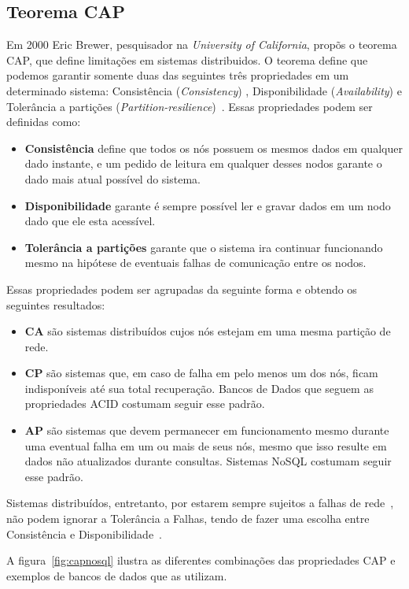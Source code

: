 \subsection{Teorema CAP}
\label{sec:cap}
	Em 2000 Eric Brewer, pesquisador na \emph{University of California}, propõs o teorema CAP, que define limitações em sistemas distribuidos. O teorema define que podemos garantir somente duas das seguintes três propriedades em um determinado sistema: Consistência (\emph{Consistency}) , Disponibilidade (\emph{Availability}) e Tolerância a partições (\emph{Partition-resilience})~\cite{brewer}. Essas propriedades podem ser definidas como:
    \begin{itemize}
	\item \textbf{Consistência} define que todos os nós possuem os mesmos dados em qualquer dado instante, e um pedido de leitura em qualquer desses nodos garante o dado mais atual possível do sistema.
    \item \textbf{Disponibilidade} garante é sempre possível ler e gravar dados em um nodo dado que ele esta acessível. 
    \item \textbf{Tolerância a partições} garante que o sistema ira continuar funcionando mesmo na hipótese de eventuais falhas de comunicação entre os nodos.
	\end{itemize}
	
    Essas propriedades podem ser agrupadas da seguinte forma e obtendo os seguintes resultados:
    \begin{itemize}
    \item \textbf{CA} são sistemas distribuídos cujos nós estejam em uma mesma partição de rede.
    \item \textbf{CP} são sistemas que, em caso de falha em pelo menos um dos nós, ficam indisponíveis até sua total recuperação. Bancos de Dados que seguem as propriedades ACID costumam seguir esse padrão.
    \item \textbf{AP} são sistemas que devem permanecer em funcionamento mesmo durante uma eventual falha em um ou mais de seus nós, mesmo que isso resulte em dados não atualizados durante consultas. Sistemas NoSQL costumam seguir esse padrão.  
	\end{itemize}
    
    Sistemas distribuídos, entretanto, por estarem sempre sujeitos a falhas de rede~\cite{deutsch}, não podem ignorar a Tolerância a Falhas, tendo de fazer uma escolha entre Consistência e Disponibilidade~\cite{brewer12years}.
    
    A figura~\ref{fig:capnosql} ilustra as diferentes combinações das propriedades CAP e exemplos de bancos de dados que as utilizam.
    

